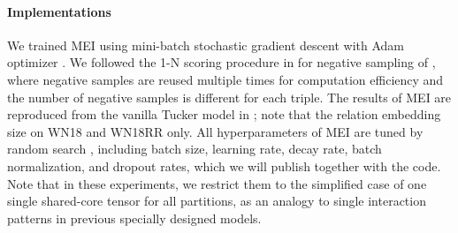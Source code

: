 \documentclass{ecai}
\theoremstyle{plain}  \newtheorem{thm}{Theorem}  \newtheorem{lem}[thm]{Lemma}  \newtheorem{prop}[thm]{Proposition}
\theoremstyle{remark}  \newtheorem*{rem}{Remark}
\begin{document}
\paragraph{Implementations}
We trained MEI using mini-batch stochastic gradient descent with Adam optimizer \cite{kingma_adammethodstochastic_2015}. We followed the 1-N scoring procedure in \cite{dettmers_convolutional2dknowledge_2018} for negative sampling of , where negative samples are reused multiple times for computation efficiency and the number of negative samples is different for each triple. The results of MEI are reproduced from the vanilla Tucker model in \cite{balazevic_tuckertensorfactorization_2019}; note that the relation embedding size  on WN18 and WN18RR only. All hyperparameters of MEI are tuned by random search \cite{bergstra_randomsearchhyperparameter_2012}, including batch size, learning rate, decay rate, batch normalization, and dropout rates, which we will publish together with the code. Note that in these experiments, we restrict them to the simplified case of one single shared-core tensor for all  partitions, as an analogy to single interaction patterns in previous specially designed models.
\end{document}
